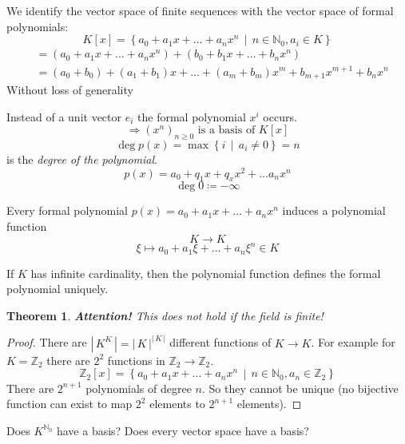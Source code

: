 \documentclass[a4paper,landscape,twocolumn]{article}
\newcommand\setdef[2]{\left\{#1\,\middle|\,#2\right\}}
\newcommand\card[1]{\left|\,#1\,\right|}
\newtheorem{theorem}{Theorem}
\begin{document}
We identify the vector space of finite sequences with the vector space of formal polynomials:
\[ K[x] = \setdef{a_0 + a_1 x + \ldots + a_n x^n}{n \in \mathbb N_0, a_i \in K} \]
\begin{align*}
    &= (a_0 + a_1 x + \ldots + a_n x^n) + (b_0 + b_1 x + \ldots + b_n x^n) \\
    &= (a_0 + b_0) + (a_1 + b_1)x + \ldots + (a_m + b_m)x^m + b_{m+1} x^{m+1} + b_n x^n
\end{align*}
Without loss of generality

Instead of a unit vector $e_i$ the formal polynomial $x^i$ occurs.
\[ \Rightarrow (x^n)_{n \geq 0} \text{ is a basis of } K[x] \]
\[ \deg{p(x)} = \max\setdef{i}{a_i \neq 0} = n \]
is the \emph{degree of the polynomial}.
\[ p(x) = a_0 + q_1 x + q_x x^2 + \ldots a_n x^n \]
\[ \deg{0} \coloneqq -\infty \]

Every formal polynomial $p(x) = a_0 + a_1 x + \ldots + a_n x^n$ induces a polynomial function
\[ K \rightarrow K \]
\[ \xi \mapsto a_0 + a_1 \xi + \ldots + a_n \xi^n \in K \]

If $K$ has infinite cardinality, then the polynomial function defines the formal polynomial uniquely.

\begin{theorem}
  \textbf{Attention!} This does not hold if the field is finite!
\end{theorem}
\begin{proof}
  There are $\card{K^K} = \card{K}^{\card{K}}$ different functions of $K \rightarrow K$.
  For example for $K = \mathbb Z_2$ there are $2^2$ functions in $\mathbb Z_2 \rightarrow \mathbb Z_2$.
  \[ \mathbb Z_2[x] = \setdef{a_0 + a_1 x + \ldots + a_n x^n}{n \in \mathbb N_0, a_n \in \mathbb Z_2} \]
  There are $2^{n+1}$ polynomials of degree $n$. So they cannot be unique (no bijective function can exist
  to map $2^2$ elements to $2^{n+1}$ elements).
\end{proof}

Does $K^{\mathbb N_0}$ have a basis?
Does every vector space have a basis?
\end{document}
